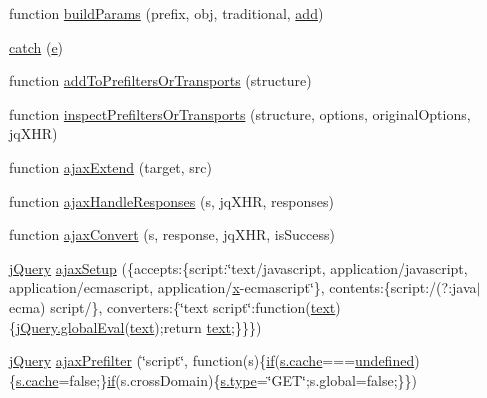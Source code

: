 \begin{DoxyCompactItemize}
\item 
function \hyperlink{jquery-1_810_82_8js_a3c4f3b337daa2444fa73ee856be5f9d8}{build\-Params} (prefix, obj, traditional, \hyperlink{jquery-1_810_82-vsdoc_8js_a2f34e089948aad779d5a43c9b381caa6}{add})
\item 
\hyperlink{jquery-1_810_82_8js_a5bf45fc51bc0426586792b5f9cb95431}{catch} (\hyperlink{jquery-1_810_82_8min_8js_a2c038346d47955cbe2cb91e338edd7e1}{e})
\item 
function \hyperlink{jquery-1_810_82_8js_ae8bffbac8c6b2208e0ca37b475ec0b70}{add\-To\-Prefilters\-Or\-Transports} (structure)
\item 
function \hyperlink{jquery-1_810_82_8js_ac96b244aea80657fe2d6e3d2c1e8b622}{inspect\-Prefilters\-Or\-Transports} (structure, options, original\-Options, jq\-X\-H\-R)
\item 
function \hyperlink{jquery-1_810_82_8js_a113ade43cfd5328ebd5ccc84f45fe4de}{ajax\-Extend} (target, src)
\item 
function \hyperlink{jquery-1_810_82_8js_a71c2db7846f21963cee426cb81003c63}{ajax\-Handle\-Responses} (s, jq\-X\-H\-R, responses)
\item 
function \hyperlink{jquery-1_810_82_8js_a549518271b8708165811ae69c274b58a}{ajax\-Convert} (s, response, jq\-X\-H\-R, is\-Success)
\item 
\hyperlink{jquery-1_810_82_8js_a5e01048fbd3a30b44e8d491d8945c457}{j\-Query} \hyperlink{jquery-1_810_82_8js_a52a40924d02e0d9756f051e36a640cd6}{ajax\-Setup} (\{accepts\-:\{script\-:\char`\"{}text/javascript, application/javascript, application/ecmascript, application/\hyperlink{jquery-1_810_82_8min_8js_a5ce50d751c9664d05375c8f5080ed43e}{x}-\/ecmascript\char`\"{}\}, contents\-:\{script\-:/(?\-:java$\vert$ecma) script/\}, converters\-:\{\char`\"{}text script\char`\"{}\-:function(\hyperlink{jquery-1_810_82-vsdoc_8js_aa5b77da29631a344064bb3d20c8702de}{text})\{\hyperlink{jquery-1_810_82-vsdoc_8js_a898e1e411825feebc0c78978f2a2a140}{j\-Query.\-global\-Eval}(\hyperlink{jquery-1_810_82-vsdoc_8js_aa5b77da29631a344064bb3d20c8702de}{text});return \hyperlink{jquery-1_810_82-vsdoc_8js_aa5b77da29631a344064bb3d20c8702de}{text};\}\}\})
\item 
\hyperlink{jquery-1_810_82_8js_a5e01048fbd3a30b44e8d491d8945c457}{j\-Query} \hyperlink{jquery-1_810_82_8js_a144939e373cc1ad511a53c4251ec7ffa}{ajax\-Prefilter} (\char`\"{}script\char`\"{}, function(s)\{\hyperlink{jquery-1_810_82_8js_aa2cebb51f03a2e3ab2af45a3f9241c96}{if}(\hyperlink{jquery-1_810_82-vsdoc_8js_acdb445beb9aa4c6dbdf28258e18dbb58}{s.\-cache}===\hyperlink{jquery-1_810_82_8js_a08113a236cc18d2a9d5ce27e638012be}{undefined})\{\hyperlink{jquery-1_810_82-vsdoc_8js_acdb445beb9aa4c6dbdf28258e18dbb58}{s.\-cache}=false;\}\hyperlink{jquery-1_810_82_8js_aa2cebb51f03a2e3ab2af45a3f9241c96}{if}(s.\-cross\-Domain)\{\hyperlink{jquery-1_810_82-vsdoc_8js_a3940565e83a9bfd10d95ffd27536da91}{s.\-type}=\char`\"{}G\-E\-T\char`\"{};s.\-global=false;\}\})

\end{DoxyCompactItemize}

